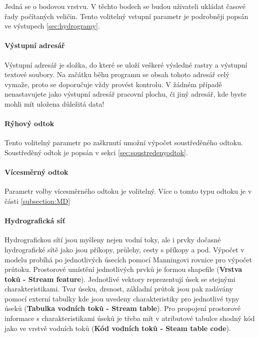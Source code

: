 Jedná  se o bodovou vrstvu. V těchto bodech se budou uživateli ukládat časové řady počítaných veličin. Tento volitelný vstupní parametr je podrobněji popsán ve výstupech \ref{sec:hydrogramy}.

\paragraph{Výstupní adresář} \label{sec:vstupadresar}
Výstupní adresář je složka, do které se uloží veškeré výsledné rastry a výstupní textové soubory. Na začátku běhu programu se obsah tohoto adresář celý vymaže, proto se doporučuje vždy provést kontrolu. V žádném případě nenastavujete jako výstupní adresář pracovní plochu, či jiný adresář, kde byste mohli mít uložena důležitá data!

\paragraph{Rýhový odtok} \label{sec:vstupryhovy}

Tento volitelný parametr po zaškrnutí umožní výpočet soustředěného odtoku. Soustředěný odtok je popsán v sekci \ref{sec:soustredenyodtok}.

\paragraph{Vícesměrný odtok} \label{sec:vstupvicesmerny}

Parametr volby vícesměrného odtoku je volitelný. Více o tomto typu odtoku je v části \ref{subsection:MD}


\paragraph{Hydrografická síť} \label{sec:vodnitoky}

Hydrografickou sítí jsou myšleny nejen vodní toky, ale i prvky dočasné hydrografické sítě jako jsou příkopy, průlehy, cesty s příkopy a pod. Výpočet v modelu probíhá po jednotlivých úsecích pomocí Manningovi rovnice pro výpočet průtoku. Prostorové umístění jednotlivých prvků je formou shapefile (\textbf{Vrstva toků - Stream feature}). Jednotlivé vektory reprezentují úsek se stejnými charakteristikami. Tvar úseku, drsnost, základní průtok jsou pak zadávány pomocí externí tabulky kde jsou uvedeny charakteristiky pro jednotlivé typy úseků (\textbf{Tabulka vodních toků - Stream table}). Pro propojení prostorové informace s charakteristikami úseků je třeba mít v atributové tabulce shodný kód jako ve vrstvě vodních toků (\textbf{Kód vodních toků - Steam table code}).






